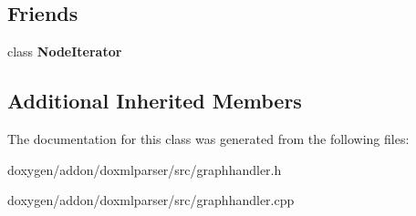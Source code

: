 \subsection*{Friends}
\begin{DoxyCompactItemize}
\item 
\mbox{\label{class_graph_handler_ac5a1d2c6036b7ba1894a7c3b8d96a312}} 
class {\bfseries Node\+Iterator}
\end{DoxyCompactItemize}
\subsection*{Additional Inherited Members}


The documentation for this class was generated from the following files\+:\begin{DoxyCompactItemize}
\item 
doxygen/addon/doxmlparser/src/graphhandler.\+h\item 
doxygen/addon/doxmlparser/src/graphhandler.\+cpp\end{DoxyCompactItemize}
